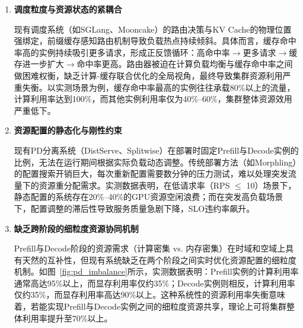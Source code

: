 \begin{enumerate}
    
\item \textbf{调度粒度与资源状态的紧耦合}

现有调度系统（如SGLang\cite{zheng2024sglang}、Mooncake\cite{qin2024mooncake}）的路由决策与KV Cache的物理位置强绑定，前缀缓存感知路由机制导致负载热点持续倾斜。具体而言，缓存命中率高的实例持续吸引更多请求，形成正反馈循环：高命中率$\to$更多请求$\to$缓存进一步扩大$\to$命中率更高。路由器被迫在计算负载均衡与缓存命中率之间做困难权衡，缺乏计算-缓存联合优化的全局视角，最终导致集群资源利用严重失衡。以实测场景为例，缓存命中率最高的实例往往承载80\%以上的流量，计算利用率达到100\%，而其他实例利用率仅为40\%--60\%\cite{he2025banaserve}，集群整体资源效用严重低下。

\item \textbf{资源配置的静态化与刚性约束}

现有PD分离系统（DistServe、Splitwise）在部署时固定Prefill与Decode实例的比例，无法在运行期间根据实际负载动态调整。传统部署方法（如Morphling）的配置搜索开销巨大，每次重新配置需要数分钟的压力测试，难以处理突发流量下的资源重分配需求。实测数据表明，在低请求率（RPS $\leq$ 10）场景下，静态配置的系统存在20\%--40\%的GPU资源空闲浪费\cite{he2025banaserve}；而在突发高负载场景下，配置调整的滞后性导致服务质量急剧下降，SLO违约率飙升。

\item \textbf{缺乏跨阶段的细粒度资源协同机制}

Prefill与Decode阶段的资源需求（计算密集 vs. 内存密集）在时域和空域上具有天然的互补性，但现有系统缺乏在两个阶段之间实时优化资源配置的细粒度机制。如图~\ref{fig:pd_imbalance}所示，实测数据表明：Prefill实例的计算利用率通常高达95\%以上，而显存利用率仅约35\%；Decode实例则相反，计算利用率仅约35\%，而显存利用率高达90\%以上\cite{he2025banaserve}。这种系统性的资源利用率失衡意味着，若能实现Prefill与Decode实例之间的细粒度资源共享，理论上可将集群整体利用率提升至70\%以上。


\begin{figure}[htbp]
  \centering
\end{figure}
\end{enumerate}
